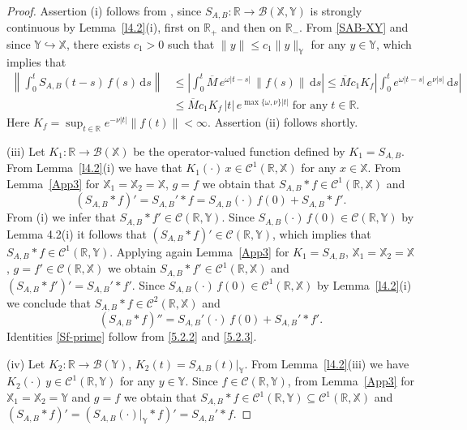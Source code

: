 \documentclass[11pt]{amsart}
\numberwithin{equation}{section}
\newcommand{\RR}{{\mathbb R}}
\newcommand{\rmd}{{\mathrm{d}}}
\theoremstyle{remark}
\theoremstyle{definition}
\newcommand\bX{{\mathbb X}}
\newcommand\bY{{\mathbb Y}}
\begin{document}
\begin{proof}
	Assertion (i) follows from \cite[Proposition 1.3.4]{ABHN}, since $S_{A,B}: \mathbb{R} \to \mathcal{B}(\bX, \bY)$ is strongly continuous by Lemma~\ref{l4.2}(i), first on $\mathbb{R}_+$ and then on $\mathbb{R}_-$. From \eqref{SAB-XY} and since $\bY \hookrightarrow \bX$, there exists $c_1 > 0$ such that
	$\|y\| \leq c_1\|y\|_\bY$ for any $y\in\bY$, which implies that 
	\begin{align}\label{5.2.1}
		\left\|\int_0^t S_{A,B}(t-s)\,f(s)\,\rmd s\right\| &\le \left|\int_0^t \overline{M}\,e^{\omega|t-s|}\,\|f(s)\|\,\rmd s\right|\le \overline{M}c_1K_f\left|\int_0^t e^{\omega|t-s|}\,e^{\nu|s|}\,\rmd s\right|\nonumber\\
		&\le \overline{M}c_1K_f\,|t|\,e^{\max\{\omega,\nu\}|t|}\;\mbox{for any}\;t\in\RR.
	\end{align}
	Here $K_f=\sup_{t \in \mathbb{R}} e^{-\nu|t|}\|f(t)\| < \infty$. Assertion (ii) follows shortly.
	
	(iii) Let $K_1: \mathbb{R} \to \mathcal{B}(\bX)$ be the operator-valued function defined by $K_1 = S_{A,B}$. From Lemma~\ref{l4.2}(i) we have that $K_1(\cdot)\,x \in \mathcal{C}^1(\mathbb{R}, \bX)$ for any $x \in \bX$. From Lemma~\ref{App3} for $\bX_1 = \bX_2 = \bX$, $g = f$ we obtain that $S_{A,B} * f \in \mathcal{C}^1(\mathbb{R}, \bX)$ and
	\begin{equation}\label{5.2.2} 
		(S_{A,B} * f)' = S_{A,B}' * f = S_{A,B}(\cdot)\,f(0) + S_{A,B} * f'.
	\end{equation}
	From (i) we infer that $S_{A,B} * f' \in \mathcal{C}(\mathbb{R}, \bY)$. Since $S_{A,B}(\cdot)\,f(0) \in \mathcal{C}(\mathbb{R}, \bY)$ by Lemma 4.2(i) it follows that $(S_{A,B} * f)' \in \mathcal{C}(\mathbb{R}, \bY)$, which implies that $S_{A,B} * f \in \mathcal{C}^1(\mathbb{R}, \bY)$. Applying again Lemma~\ref{App3} for $K_1 = S_{A,B}$, $\bX_1 = \bX_2 = \bX$, $g = f' \in \mathcal{C}(\mathbb{R}, \bX)$ we obtain $S_{A,B} * f' \in \mathcal{C}^1(\mathbb{R}, \bX)$ and $(S_{A,B} * f')' = S_{A,B}' * f'$. Since $S_{A,B}(\cdot)\,f(0) \in \mathcal{C}^1(\mathbb{R}, \bX)$ by Lemma~\ref{l4.2}(i) we conclude that $S_{A,B} * f \in \mathcal{C}^2(\mathbb{R}, \bX)$ and
	\begin{equation}\label{5.2.3} (S_{A,B} * f)'' = S_{A,B}'(\cdot)\,f(0) + S_{A,B}' * f'.
	\end{equation}
	Identities \eqref{Sf-prime} follow from \eqref{5.2.2} and \eqref{5.2.3}.
	
	(iv) Let $K_2: \mathbb{R} \to \mathcal{B}(\bY)$, $K_2(t) = S_{A,B}(t)|_\bY$. From Lemma~\ref{l4.2}(iii) we have $K_2(\cdot)\,y \in \mathcal{C}^1(\mathbb{R}, \bY)$ for any $y \in \bY$. Since $f \in \mathcal{C}(\mathbb{R}, \bY)$, from Lemma~\ref{App3} for $\bX_1 = \bX_2 = \bY$ and $g = f$ we obtain that $S_{A,B} * f \in \mathcal{C}^1(\mathbb{R}, \bY) \subseteq \mathcal{C}^1(\mathbb{R}, \bX)$ and $(S_{A,B} * f)' =(S_{A,B}(\cdot)|_\bY*f)'= S_{A,B}' * f$.
	

\end{proof}
\end{document}
